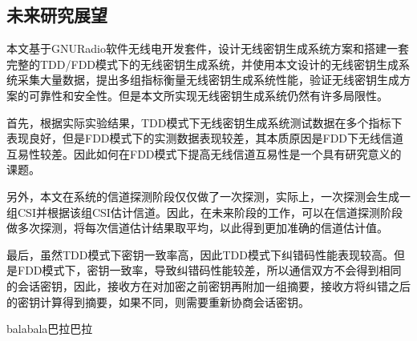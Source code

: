 \documentclass[master]{seuthesis} %
\begin{document}
\begin{Main}
\section{未来研究展望}

本文基于GNURadio软件无线电开发套件，设计无线密钥生成系统方案和搭建一套完整的TDD/FDD模式下的无线密钥生成系统，并使用本文设计的无线密钥生成系统采集大量数据，提出多组指标衡量无线密钥生成系统性能，验证无线密钥生成方案的可靠性和安全性。但是本文所实现无线密钥生成系统仍然有许多局限性。

首先，根据实际实验结果，TDD模式下无线密钥生成系统测试数据在多个指标下表现良好，但是FDD模式下的实测数据表现较差，其本质原因是FDD下无线信道互易性较差。因此如何在FDD模式下提高无线信道互易性是一个具有研究意义的课题。

另外，本文在系统的信道探测阶段仅仅做了一次探测，实际上，一次探测会生成一组CSI并根据该组CSI估计信道。因此，在未来阶段的工作，可以在信道探测阶段做多次探测，将每次信道估计结果取平均，以此得到更加准确的信道估计值。

最后，虽然TDD模式下密钥一致率高，因此TDD模式下纠错码性能表现较高。但是FDD模式下，密钥一致率，导致纠错码性能较差，所以通信双方不会得到相同的会话密钥，因此，接收方在对加密之前密钥再附加一组摘要，接收方将纠错之后的密钥计算得到摘要，如果不同，则需要重新协商会话密钥。

\end{Main} %

\begin{Acknowledgement}{}

balabala巴拉巴拉
\end{Acknowledgement}





\newpage
\printindex %



% 
% 
\end{document}
